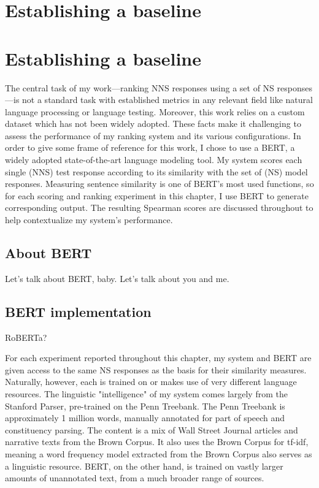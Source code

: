 \section{Establishing a baseline}
\section{Establishing a baseline}
\label{sec:bert-baseline}
The central task of my work---ranking NNS responses using a set of NS responses---is not a standard task with established metrics in any relevant field like natural language processing or language testing. Moreover, this work relies on a custom dataset which has not been widely adopted. These facts make it challenging to assess the performance of my ranking system and its various configurations. In order to give some frame of reference for this work, I chose to use a BERT, a widely adopted state-of-the-art language modeling tool. My system scores each single (NNS) test response according to its similarity with the set of (NS) model responses. Measuring sentence similarity is one of BERT's most used functions, so for each scoring and ranking experiment in this chapter, I use BERT to generate corresponding output. The resulting Spearman scores are discussed throughout to help contextualize my system's performance.
\subsection{About BERT}
\label{sec:about-bert}
Let's talk about BERT, baby. Let's talk about you and me.

\subsection{BERT implementation}
RoBERTa?

For each experiment reported throughout this chapter, my system and BERT are given access to the same NS responses as the basis for their similarity measures. Naturally, however, each is trained on or makes use of very different language resources. The linguistic "intelligence" of my system comes largely from the Stanford Parser, pre-trained on the Penn Treebank. The Penn Treebank is approximately 1 million words, manually annotated for part of speech and constituency parsing. The content is a mix of Wall Street Journal articles and narrative texts from the Brown Corpus. It also uses the Brown Corpus for tf-idf, meaning a word frequency model extracted from the Brown Corpus also serves as a linguistic resource. BERT, on the other hand, is trained on vastly larger amounts of unannotated text, from a much broader range of sources.

